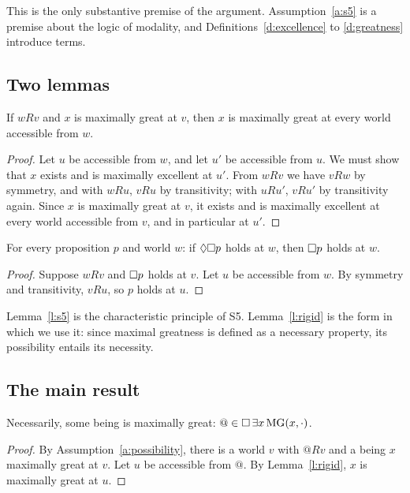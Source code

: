 \documentclass{situationist-preprint}
\begin{document}
This is the only substantive premise of the argument. Assumption~\ref{a:s5} is a premise about the logic of modality, and Definitions~\ref{d:excellence} to \ref{d:greatness} introduce terms.

\subsection{Two lemmas}

\begin{lemma}\label{l:rigid}
If $wRv$ and $x$ is maximally great at $v$, then $x$ is maximally great at every world accessible from $w$.
\end{lemma}

\begin{proof}
Let $u$ be accessible from $w$, and let $u'$ be accessible from $u$. We must show that $x$ exists and is maximally excellent at $u'$. From $wRv$ we have $vRw$ by symmetry, and with $wRu$, $vRu$ by transitivity; with $uRu'$, $vRu'$ by transitivity again. Since $x$ is maximally great at $v$, it exists and is maximally excellent at every world accessible from $v$, and in particular at $u'$.
\end{proof}

\begin{lemma}\label{l:s5}
For every proposition $p$ and world $w$: if $\mathord{\Diamond}\mathord{\Box} p$ holds at $w$, then $\mathord{\Box} p$ holds at $w$.
\end{lemma}

\begin{proof}
Suppose $wRv$ and $\mathord{\Box} p$ holds at $v$. Let $u$ be accessible from $w$. By symmetry and transitivity, $vRu$, so $p$ holds at $u$.
\end{proof}

Lemma~\ref{l:s5} is the characteristic principle of S5. Lemma~\ref{l:rigid} is the form in which we use it: since maximal greatness is defined as a necessary property, its possibility entails its necessity.

\subsection{The main result}

\begin{theorem}\label{t:main}
Necessarily, some being is maximally great: $@ \in \mathord{\Box}\,\exists x\, \mathrm{MG}(x,\cdot)$.
\end{theorem}

\begin{proof}
By Assumption~\ref{a:possibility}, there is a world $v$ with $@Rv$ and a being $x$ maximally great at $v$. Let $u$ be accessible from $@$. By Lemma~\ref{l:rigid}, $x$ is maximally great at $u$.
\end{proof}
\end{document}
